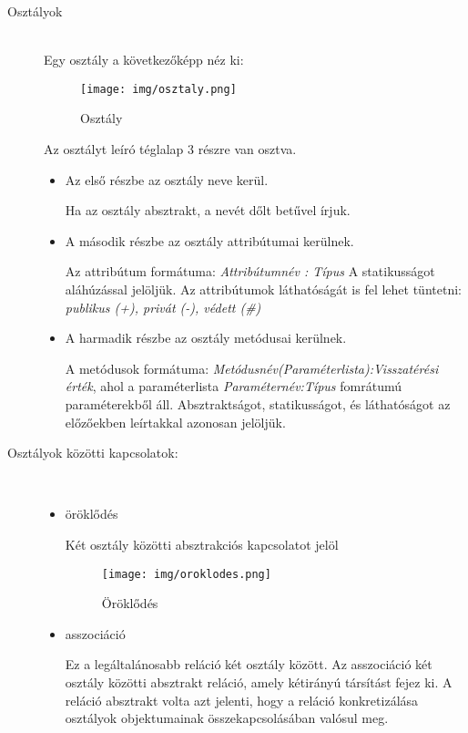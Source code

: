 \documentclass[margin=0px]{article}
\begin{document}
			\begin{description}
				\item[Osztályok] \hfill \\
				
				Egy osztály a következőképp néz ki:
				\begin{figure}[H]
					\centering
					\texttt{[image: img/osztaly.png]}
					\caption{Osztály}
				\end{figure}
				
				Az osztályt leíró téglalap 3 részre van osztva.
					\begin{itemize}
						\item Az első részbe az osztály neve kerül.
						
						Ha az osztály absztrakt, a nevét dőlt betűvel írjuk.
						
						\item A második részbe az osztály attribútumai kerülnek.
						
						Az attribútum formátuma: \textit{Attribútumnév : Típus}
						A statikusságot aláhúzással jelöljük.
						Az attribútumok láthatóságát is fel lehet tüntetni: \textit{ publikus (+), privát (-), védett (\#)}
						
						\item A harmadik részbe az osztály metódusai kerülnek.
						
						A metódusok formátuma: \textit{Metódusnév(Paraméterlista):Visszatérési érték}, ahol a paraméterlista \textit{Paraméternév:Típus} fomrátumú paraméterekből áll.
						Absztraktságot, statikusságot, és láthatóságot az előzőekben leírtakkal azonosan jelöljük.
 					\end{itemize}
 				\item[Osztályok közötti kapcsolatok:] \hfill \\
 					
 					\begin{itemize}
 						\item öröklődés
	 						
	 						Két osztály közötti absztrakciós kapcsolatot jelöl
	 						\begin{figure}[H]
	 							\centering
	 							\texttt{[image: img/oroklodes.png]}
	 							\caption{Öröklődés}
	 						\end{figure}
	 						
 						\item asszociáció
	 						
	 						Ez a legáltalánosabb reláció két osztály között. Az asszociáció két osztály
	 						közötti absztrakt reláció, amely kétirányú társítást fejez ki. A
	 						reláció absztrakt volta azt jelenti, hogy a reláció konkretizálása osztályok
	 						objektumainak összekapcsolásában valósul meg.
	 						

\end{itemize}
\end{description}
\end{document}
